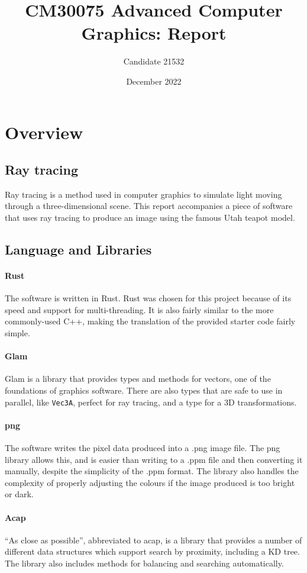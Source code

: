 \documentclass[a4paper]{article}
\title{CM30075 Advanced Computer Graphics: Report}
\author{Candidate 21532}
\date{December 2022}
\begin{document}
\maketitle
\tableofcontents

\section{Overview}
\subsection{Ray tracing}
Ray tracing is a method used in computer graphics to simulate light moving through a three-dimensional scene. This report accompanies a piece of software that uses ray tracing to produce an image using the famous Utah teapot model.

\subsection{Language and Libraries}
\paragraph{Rust} The software is written in Rust. Rust was chosen for this project because of its speed and support for multi-threading. It is also fairly similar to the more commonly-used C++, making the translation of the provided starter code fairly simple.

\paragraph{Glam} Glam is a library that provides types and methods for vectors, one of the foundations of graphics software. There are also types that are safe to use in parallel, like \texttt{Vec3A}, perfect for ray tracing, and a type for a 3D transformations.

\paragraph{png} The software writes the pixel data produced into a .png image file. The png library allows this, and is easier than writing to a .ppm file and then converting it manually, despite the simplicity of the .ppm format. The library also handles the complexity of properly adjusting the colours if the image produced is too bright or dark.

\paragraph{Acap} ``As close as possible'', abbreviated to acap, is a library that provides a number of different data structures which support search by proximity, including a KD tree. The library also includes methods for balancing and searching automatically.
\end{document}
